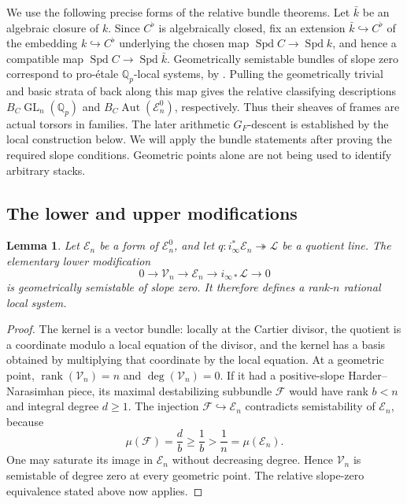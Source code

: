 \documentclass[11pt]{article}
\numberwithin{equation}{section}
\newtheorem{lemma}[theorem]{Lemma}
\theoremstyle{definition}
\theoremstyle{remark}
\begin{document}
We use the following precise forms of the relative bundle theorems.
Let $\bar k$ be an algebraic closure of $k$.  Since $C^\flat$ is
algebraically closed, fix an extension $\bar k\hookrightarrow C^\flat$
of the embedding $k\hookrightarrow C^\flat$ underlying the chosen map
$\operatorname{Spd} C\to\operatorname{Spd} k$, and hence a compatible map
$\operatorname{Spd} C\to\operatorname{Spd}\bar k$.  Geometrically semistable bundles of slope zero
correspond to pro-\'etale $\mathbb Q_p$-local systems, by
\cite[Theorem II.2.19 and Corollary II.2.20]{FS}.
Pulling the geometrically trivial and basic strata of
\cite[Theorems III.2.4 and III.4.5]{FS} back along this map gives the
relative classifying descriptions $B_C\operatorname{GL}_n(\mathbb Q_p)$ and
$B_C\operatorname{Aut}(\mathcal E_n^0)$, respectively.
Thus their sheaves of frames are actual torsors in families.
The later arithmetic $G_F$-descent is established by the local
construction below.  We will apply the bundle statements after proving
the required slope conditions.  Geometric points alone are not being
used to identify arbitrary stacks.

\subsection{The lower and upper modifications}

\begin{lemma}\label{lem:lower-modification}
Let $\mathcal E_n$ be a form of $\mathcal E_n^0$, and let
$q:i_\infty^*\mathcal E_n\twoheadrightarrow\mathcal L$ be a quotient
line.  The elementary lower modification
\[
 0\longrightarrow\mathcal V_n\longrightarrow\mathcal E_n
 \longrightarrow i_{\infty *}\mathcal L\longrightarrow0
\]
is geometrically semistable of slope zero.  It therefore defines a
rank-$n$ rational local system.
\end{lemma}

\begin{proof}
The kernel is a vector bundle: locally at the Cartier divisor, the
quotient is a coordinate modulo a local equation of the divisor, and
the kernel has a basis obtained by multiplying that coordinate by the
local equation.  At a geometric point,
$\operatorname{rank}(\mathcal V_n)=n$ and $\deg(\mathcal V_n)=0$.
If it had a positive-slope Harder--Narasimhan piece, its maximal
destabilizing subbundle $\mathcal F$ would have rank $b<n$ and integral
degree $d\geq1$.  The injection $\mathcal F\hookrightarrow\mathcal E_n$
contradicts semistability of $\mathcal E_n$, because
\[
 \mu(\mathcal F)=\frac d b\geq\frac1b>\frac1n
       =\mu(\mathcal E_n).
\]
One may saturate its image in $\mathcal E_n$ without decreasing degree.
Hence $\mathcal V_n$ is semistable of degree zero at every geometric
point.  The relative slope-zero equivalence stated above now applies.
\end{proof}
\end{document}
